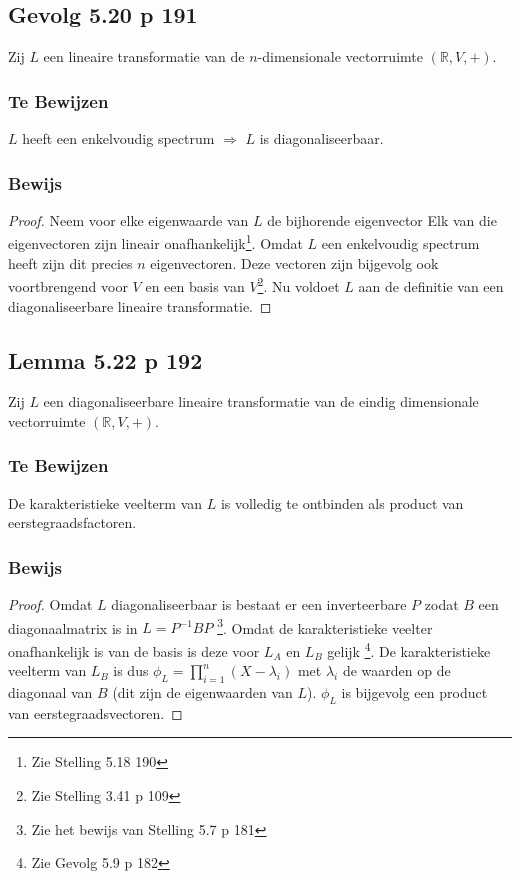 \documentclass[lineaire_algebra_oplossingen.tex]{subfiles}
\begin{document}
\subsection{Gevolg 5.20 p 191}
Zij $L$ een lineaire transformatie van de $n$-dimensionale vectorruimte $(\mathbb{R},V,+)$.

\subsubsection*{Te Bewijzen}
\begin{center}
$L$ heeft een enkelvoudig spectrum $\Rightarrow$ $L$ is diagonaliseerbaar.
\end{center}

\subsubsection*{Bewijs}
\begin{proof}
Neem voor elke eigenwaarde van $L$ de bijhorende eigenvector
Elk van die eigenvectoren zijn lineair onafhankelijk\footnote{Zie Stelling 5.18 190}.
Omdat $L$ een enkelvoudig spectrum heeft zijn dit precies $n$ eigenvectoren.
Deze vectoren zijn bijgevolg ook voortbrengend voor $V$ en een basis van $V$\footnote{Zie Stelling 3.41 p 109}.
Nu voldoet $L$ aan de definitie van een diagonaliseerbare lineaire transformatie.
\end{proof}


\subsection{Lemma 5.22 p 192}
Zij $L$ een diagonaliseerbare lineaire transformatie van de eindig dimensionale vectorruimte $(\mathbb{R},V,+)$.

\subsubsection*{Te Bewijzen}
De karakteristieke veelterm van $L$ is volledig te ontbinden als product van eerstegraadsfactoren.

\subsubsection*{Bewijs}
\begin{proof}
Omdat $L$ diagonaliseerbaar is bestaat er een inverteerbare $P$ zodat $B$ een diagonaalmatrix is in $L = P^{-1}BP$ \footnote{Zie het bewijs van Stelling 5.7 p 181}. Omdat de karakteristieke veelter onafhankelijk is van de basis is deze voor $L_A$ en $L_B$ gelijk \footnote{Zie Gevolg 5.9 p 182}. De karakteristieke veelterm van $L_B$ is dus $\phi_L = \prod_{i=1}^n(X-\lambda_i)$ met $\lambda_i$ de waarden op de diagonaal van $B$ (dit zijn de eigenwaarden van $L$).  $\phi_L$ is bijgevolg een product van eerstegraadsvectoren.
\end{proof}
\end{document}
